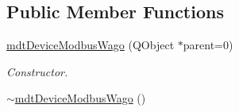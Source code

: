 \subsection*{Public Member Functions}
\begin{DoxyCompactItemize}
\item 
\hypertarget{classmdt_device_modbus_wago_a31abb03678a8afe2e6bf7c03e5e92726}{
\hyperlink{classmdt_device_modbus_wago_a31abb03678a8afe2e6bf7c03e5e92726}{mdtDeviceModbusWago} (QObject $\ast$parent=0)}
\label{classmdt_device_modbus_wago_a31abb03678a8afe2e6bf7c03e5e92726}

\begin{DoxyCompactList}\small\item\em Constructor. \end{DoxyCompactList}\item 
\hypertarget{classmdt_device_modbus_wago_a8a13bfe3028d8c286d4233ea0ce0b2a8}{
\hyperlink{classmdt_device_modbus_wago_a8a13bfe3028d8c286d4233ea0ce0b2a8}{$\sim$mdtDeviceModbusWago} ()}
\label{classmdt_device_modbus_wago_a8a13bfe3028d8c286d4233ea0ce0b2a8}


\end{DoxyCompactItemize}
